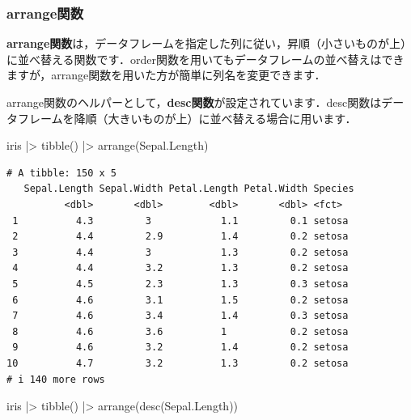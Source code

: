 \documentclass[
  letterpaper,
  DIV=11,
  numbers=noendperiod]{scrreprt}
\newenvironment{Shaded}{\begin{snugshade}}{\end{snugshade}}
\newcommand{\FunctionTok}[1]{\textcolor[rgb]{0.28,0.35,0.67}{#1}}
\newcommand{\NormalTok}[1]{\textcolor[rgb]{0.00,0.23,0.31}{#1}}
\newcommand{\SpecialCharTok}[1]{\textcolor[rgb]{0.37,0.37,0.37}{#1}}
\begin{document}
\hypertarget{arrangeux95a2ux6570}{%
\subsubsection{arrange関数}\label{arrangeux95a2ux6570}}

\textbf{arrange関数}は，データフレームを指定した列に従い，昇順（小さいものが上）に並べ替える関数です．order関数を用いてもデータフレームの並べ替えはできますが，arrange関数を用いた方が簡単に列名を変更できます．

arrange関数のヘルパーとして，\textbf{desc関数}が設定されています．desc関数はデータフレームを降順（大きいものが上）に並べ替える場合に用います．

\begin{Shaded}
\begin{Highlighting}[]
\NormalTok{iris }\SpecialCharTok{|\textgreater{}} \FunctionTok{tibble}\NormalTok{() }\SpecialCharTok{|\textgreater{}} \FunctionTok{arrange}\NormalTok{(Sepal.Length)}
\end{Highlighting}
\end{Shaded}

\begin{verbatim}
# A tibble: 150 x 5
   Sepal.Length Sepal.Width Petal.Length Petal.Width Species
          <dbl>       <dbl>        <dbl>       <dbl> <fct>  
 1          4.3         3            1.1         0.1 setosa 
 2          4.4         2.9          1.4         0.2 setosa 
 3          4.4         3            1.3         0.2 setosa 
 4          4.4         3.2          1.3         0.2 setosa 
 5          4.5         2.3          1.3         0.3 setosa 
 6          4.6         3.1          1.5         0.2 setosa 
 7          4.6         3.4          1.4         0.3 setosa 
 8          4.6         3.6          1           0.2 setosa 
 9          4.6         3.2          1.4         0.2 setosa 
10          4.7         3.2          1.3         0.2 setosa 
# i 140 more rows
\end{verbatim}

\begin{Shaded}
\begin{Highlighting}[]
\NormalTok{iris }\SpecialCharTok{|\textgreater{}} \FunctionTok{tibble}\NormalTok{() }\SpecialCharTok{|\textgreater{}} \FunctionTok{arrange}\NormalTok{(}\FunctionTok{desc}\NormalTok{(Sepal.Length))}
\end{Highlighting}
\end{Shaded}
\end{document}
